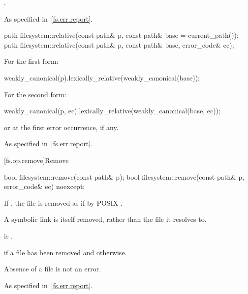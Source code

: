 \begin{itemdescr}
\pnum
\returns
{}.

\pnum
\throws
As specified in~\ref{fs.err.report}.
\end{itemdescr}

%
\begin{itemdecl}
path filesystem::relative(const path& p, const path& base = current_path());
path filesystem::relative(const path& p, const path& base, error_code& ec);
\end{itemdecl}

\begin{itemdescr}
\pnum
\returns
For the first form:
\begin{codeblock}
weakly_canonical(p).lexically_relative(weakly_canonical(base));
\end{codeblock}
  For the second form:
\begin{codeblock}
weakly_canonical(p, ec).lexically_relative(weakly_canonical(base, ec));
\end{codeblock}
  or  at the first error occurrence, if any.

\pnum
\throws
As specified in~\ref{fs.err.report}.
\end{itemdescr}

[fs.op.remove]{Remove}

%
\begin{itemdecl}
bool filesystem::remove(const path& p);
bool filesystem::remove(const path& p, error_code& ec) noexcept;
\end{itemdecl}

\begin{itemdescr}
\pnum
\effects
If , the file  is
  removed as if by POSIX .
\begin{note}
A symbolic link is itself removed, rather than the file it
  resolves to.
\end{note}

\pnum
\ensures
{} is .

\pnum
\returns
{} if a file  has been removed and  otherwise.
\begin{note}
Absence of a file  is not an error.
\end{note}

\pnum
\throws
As specified in~\ref{fs.err.report}.
\end{itemdescr}



